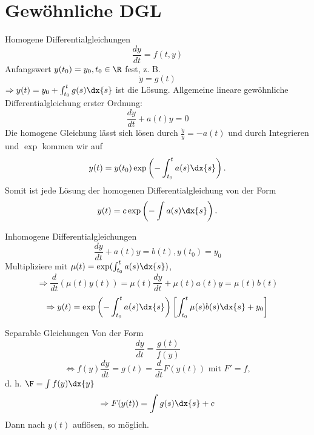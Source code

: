 \section{Gewöhnliche DGL}

\begin{karte}{Homogene Differentialgleichungen}
    \[ \frac{dy}{dt} = f(t,y) \]
    Anfangswert \(y(t_0) = y_0, t_0 \in \R\) fest, z. B. 
    \[ \dot{y} = g(t) \]
    \(\Rightarrow y(t) = y_0 + \int_{t_0}^t g(s) \dx{s} \) ist die Lösung. 
    Allgemeine lineare gewöhnliche Differentialgleichung erster Ordnung: 
    \[ \frac{dy}{dt} + a(t) y = 0 \]
    Die homogene Gleichung lässt sich lösen durch 
    \(\frac{\dot{y}}{y} = -a(t)\) und durch Integrieren und \(\exp\) kommen wir auf 
    \[ y(t) = y(t_0) \exp\left( -\int_{t_0}^t a(s) \dx{s} \right). \]
    Somit ist jede Lösung der homogenen Differentialgleichung von der Form 
    \[ y(t) = c \exp \left( -\int a(s) \dx{s} \right). \]
\end{karte}

\begin{karte}{Inhomogene Differentialgleichungen}
    \[ \frac{dy}{dt} + a(t) y = b(t), y(t_0) = y_0 \]
    Multipliziere mit \(\mu(t) = \exp(\int_{t_0}^t a(s) \dx{s})\),
    \[ \Rightarrow \frac{d}{dt} (\mu(t) y(t)) = \mu(t)\frac{dy}{dt} + \mu(t) a(t) y = \mu(t) b(t) \]
    \[ \Rightarrow y(t) = \exp\left( -\int_{t_0}^t a(s) \dx{s} \right) \left[ \int_{t_0}^t \mu(s) b(s) \dx{s} + y_0 \right] \]
\end{karte}

\begin{karte}{Separable Gleichungen}
    Von der Form 
    \[ \frac{dy}{dt} = \frac{g(t)}{f(y)} \]
    \[ \Leftrightarrow f(y) \frac{dy}{dt} = g(t) = \frac{d}{dt} F(y(t)) 
    \text{ mit } F' = f, \]
    d. h. \(\F = \int f(y) \dx{y}\)
    \[\Rightarrow F(y(t) ) = \int g(s) \dx{s} + c \]
    Dann nach \(y(t) \) auflösen, so möglich.
\end{karte}